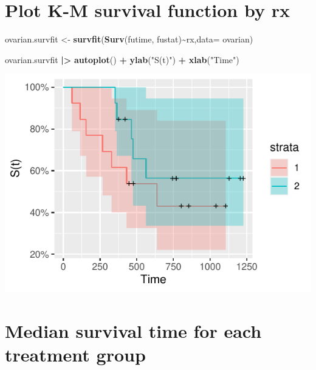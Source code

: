 \documentclass[
]{article}
\newenvironment{Shaded}{\begin{snugshade}}{\end{snugshade}}
\newcommand{\AttributeTok}[1]{\textcolor[rgb]{0.13,0.29,0.53}{#1}}
\newcommand{\FunctionTok}[1]{\textcolor[rgb]{0.13,0.29,0.53}{\textbf{#1}}}
\newcommand{\NormalTok}[1]{#1}
\newcommand{\OtherTok}[1]{\textcolor[rgb]{0.56,0.35,0.01}{#1}}
\newcommand{\SpecialCharTok}[1]{\textcolor[rgb]{0.81,0.36,0.00}{\textbf{#1}}}
\newcommand{\StringTok}[1]{\textcolor[rgb]{0.31,0.60,0.02}{#1}}
\begin{document}
\hypertarget{plot-k-m-survival-function-by-rx}{%
\section{Plot K-M survival function by
rx}\label{plot-k-m-survival-function-by-rx}}

\begin{Shaded}
\begin{Highlighting}[]
\NormalTok{ovarian.survfit }\OtherTok{\textless{}{-}}
  \FunctionTok{survfit}\NormalTok{(}\FunctionTok{Surv}\NormalTok{(futime, fustat)}\SpecialCharTok{\textasciitilde{}}\NormalTok{rx,}\AttributeTok{data=}\NormalTok{ ovarian)}

\NormalTok{ovarian.survfit }\SpecialCharTok{|\textgreater{}}
  \FunctionTok{autoplot}\NormalTok{() }\SpecialCharTok{+}
  \FunctionTok{ylab}\NormalTok{(}\StringTok{"S(t)"}\NormalTok{) }\SpecialCharTok{+}
  \FunctionTok{xlab}\NormalTok{(}\StringTok{"Time"}\NormalTok{)}
\end{Highlighting}
\end{Shaded}

\begin{center}\includegraphics{Problem3_files/figure-latex/unnamed-chunk-5-1} \end{center}

\hypertarget{median-survival-time-for-each-treatment-group}{%
\section{Median survival time for each treatment
group}\label{median-survival-time-for-each-treatment-group}}
\end{document}
